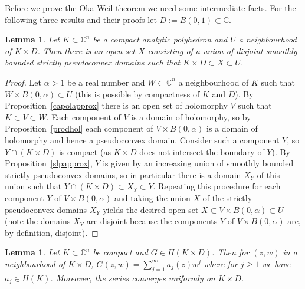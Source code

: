 \documentclass[11pt,a4paper, final, twoside]{article}
\newtheorem{lemma}[theorem]{Lemma}
\numberwithin{equation}{section}
\newcommand{\C}{\mathbb C}
\newcommand{\clos}[1]{\overline{#1}}
\newcommand{\ball}{B}
\newcommand{\hol}{H}
\begin{document}
Before we prove the Oka-Weil theorem we need some intermediate facts. For the following three results and their proofs let $D:=\clos{\ball(0,1)}\subset\C$.
\begin{lemma}
\label{spsapproxcapol}
Let $K\subset\C^n$ be a compact analytic polyhedron and $U$ a neighbourhood of $K\times D$. 
Then there is an open set $X$ consisting of a union of disjoint smoothly bounded strictly pseudoconvex domains such that $K\times D\subset X\subset U$.
\end{lemma}
\begin{proof}
Let $\alpha>1$ be a real number and $W\subset\C^n$ a neighbourhood of $K$ such that $W\times\ball(0,\alpha)\subset U$ (this is possible by compactness of $K$ and $D$).
By Proposition~\ref{capolapprox} there is an open set of holomorphy $V$ such that $K\subset V\subset W$. Each component of $V$ is a domain of holomorphy,
so by Proposition~\ref{prodhol} each component of $V\times \ball(0,\alpha)$ is a domain of holomorphy and hence a pseudoconvex domain. Consider such a component $Y$, so $Y\cap (K\times D)$
is compact (as $K\times D$ does not intersect the boundary of $Y$). By Proposition~\ref{slpapprox},
$Y$ is given by an increasing union of smoothly bounded strictly pseudoconvex domains,
so in particular there is a domain $X_Y$ of this union such that $Y\cap (K\times D)\subset X_Y\subset Y$. 
Repeating this procedure for each component $Y$ of $V\times\ball(0,\alpha)$
and taking the union $X$ 
of the strictly pseudoconvex domains $X_Y$ yields the desired open set $X\subset V\times\ball(0,\alpha)\subset U$ (note the domains $X_Y$ are disjoint because the components $Y$ of $V\times\ball(0,\alpha)$
are, by definition, disjoint).
\end{proof}
\begin{lemma}
\label{sneakyapprox}
Let $K\subset\C^n$ be compact and $G\in\hol(K\times D)$. Then for $(z,w)$ in a neighbourhood of $K\times D$, 
$G(z,w)=\sum_{j=1}^\infty a_j(z)w^j$ where for $j\geq 1$ we have $a_j\in\hol(K)$. Moreover, the series converges uniformly on $K\times D$.
\end{lemma}
\end{document}
